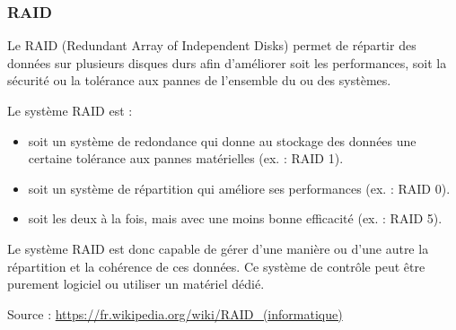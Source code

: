 	
	\begin{frame}[containsverbatim]
		\frametitle{RAID} 
		{\small Le RAID (Redundant Array of Independent Disks)  permet de répartir des données sur plusieurs disques durs afin d'améliorer soit les performances, soit la sécurité ou la tolérance aux pannes de l'ensemble du ou des systèmes.
			
			Le système RAID est :
			\begin{itemize}
				\item   soit un système de redondance qui donne au stockage des données une certaine tolérance aux pannes matérielles (ex. : RAID 1).
				\item soit un système de répartition qui améliore ses performances (ex. : RAID 0).
				\item soit les deux à la fois, mais avec une moins bonne efficacité (ex. : RAID 5).
			\end{itemize}
			
			
			
			Le système RAID est donc capable de gérer d'une manière ou d'une autre la répartition et la cohérence de ces données. Ce système de contrôle peut être purement logiciel ou utiliser un matériel dédié.}
		
		{\tiny {\footnotesize Source : \url{https://fr.wikipedia.org/wiki/RAID_(informatique)}}}
	\end{frame}
	
	
	
